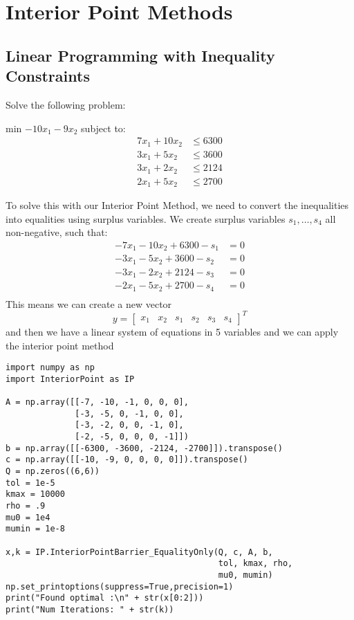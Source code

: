 \documentclass[11pt]{article}
\author{Nicholas Moore}
\date{\today}
\title{}
\begin{document}
\tableofcontents

\section{Interior Point Methods}
\label{sec:org3bad664}
\subsection{Linear Programming with Inequality Constraints}
\label{sec:orgaee3af7}
Solve the following problem:

min \(-10x_1 - 9x_2\) subject to:
\begin{align*}
  7x_1 + 10x_2 &\leq 6300 \\
  3x_1 +  5x_2 &\leq 3600 \\
  3x_1 +  2x_2 &\leq 2124 \\
  2x_1 +  5x_2 &\leq 2700
\end{align*}

To solve this with our Interior Point Method, we need to convert the inequalities into equalities using surplus variables. We create surplus variables \(s_1,\ldots,s_4\) all non-negative, such that:
\begin{align*}
 -7x_1 - 10x_2 + 6300 - s_1 &= 0 \\
 -3x_1 - 5x_2  + 3600 - s_2 &= 0 \\
 -3x_1 - 2x_2  + 2124 - s_3 &= 0 \\
 -2x_1 - 5x_2  + 2700 - s_4 &= 0 \\
\end{align*}
This means we can create a new vector
\begin{equation*}
 y = \begin{bmatrix} x_1 & x_2 & s_1 & s_2 & s_3 & s_4 \end{bmatrix}^T
\end{equation*}
and then we have a linear system of equations in 5 variables and we can apply the interior point method

\begin{verbatim}
import numpy as np
import InteriorPoint as IP

A = np.array([[-7, -10, -1, 0, 0, 0],
              [-3, -5, 0, -1, 0, 0],
              [-3, -2, 0, 0, -1, 0],
              [-2, -5, 0, 0, 0, -1]])
b = np.array([[-6300, -3600, -2124, -2700]]).transpose()
c = np.array([[-10, -9, 0, 0, 0, 0]]).transpose()
Q = np.zeros((6,6))
tol = 1e-5
kmax = 10000
rho = .9
mu0 = 1e4
mumin = 1e-8

x,k = IP.InteriorPointBarrier_EqualityOnly(Q, c, A, b, 
                                           tol, kmax, rho, 
                                           mu0, mumin)
np.set_printoptions(suppress=True,precision=1)
print("Found optimal :\n" + str(x[0:2]))
print("Num Iterations: " + str(k))
\end{verbatim}
\end{document}
